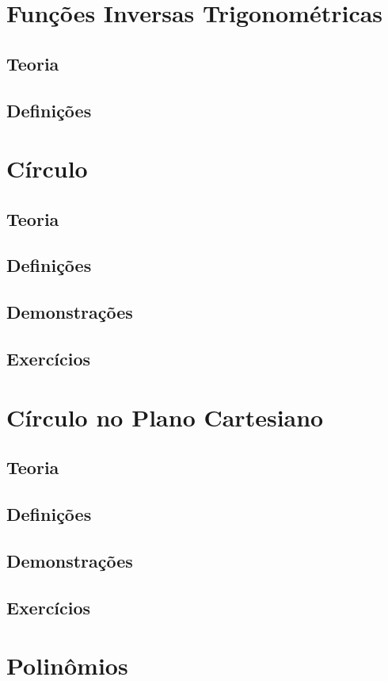 \documentclass[portuguese, 12pt, a4paper]{article}
\begin{document}
	\section{Funções Inversas Trigonométricas}
	\subsection{Teoria}
	\subsection{Definições}
	
	\section{Círculo}
	\subsection{Teoria}
	\subsection{Definições}
	\subsection{Demonstrações}
	\subsection{Exercícios}
	
	\section{Círculo no Plano Cartesiano}
	\subsection{Teoria}
	\subsection{Definições}
	\subsection{Demonstrações}
	\subsection{Exercícios}
	
	\section{Polinômios}
\end{document}
